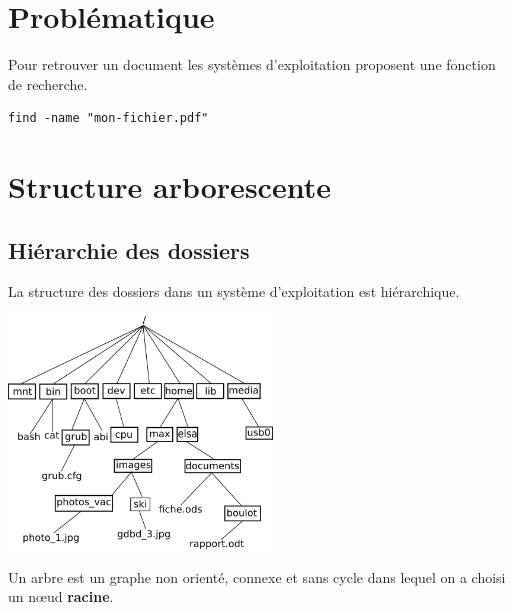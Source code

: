 \documentclass[a4paper,11pt]{article}
\begin{document}
\begin{Form}
\section{Problématique}
Pour retrouver un document les systèmes d'exploitation proposent une fonction de recherche.
\begin{center}
\begin{lstlisting}
find -name "mon-fichier.pdf"
\end{lstlisting}
\label{find}
\end{center}
\begin{center}
\end{center}
\section{Structure arborescente}
\subsection{Hiérarchie des dossiers}
La structure des dossiers dans un système d'exploitation est hiérarchique.
\begin{center}
\centering
\includegraphics[width=7cm]{ressources/arbre-linux.png}
\label{hierarchihe}
\end{center}
\begin{aretenir}[]
Un arbre est un graphe non orienté, connexe et sans cycle dans lequel on a choisi un nœud \textbf{racine}.
\end{aretenir}

\end{Form}
\end{document}
